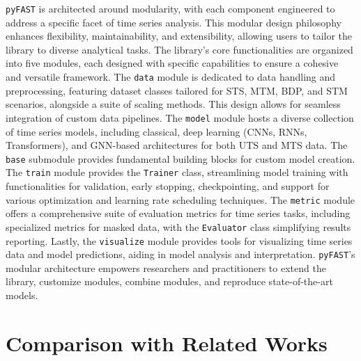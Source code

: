 \documentclass{article}
\begin{document}
\texttt{pyFAST} is architected around modularity, with each component engineered to address a specific facet of time series analysis. This modular design philosophy enhances flexibility, maintainability, and extensibility, allowing users to tailor the library to diverse analytical tasks. The library’s core functionalities are organized into five modules, each designed with specific capabilities to ensure a cohesive and versatile framework. The \texttt{data} module is dedicated to data handling and preprocessing, featuring dataset classes tailored for STS, MTM, BDP, and STM scenarios, alongside a suite of scaling methods. This design allows for seamless integration of custom data pipelines.  The \texttt{model} module hosts a diverse collection of time series models, including classical, deep learning (CNNs, RNNs, Transformers), and GNN-based architectures for both UTS and MTS data. The \texttt{base} submodule provides fundamental building blocks for custom model creation.  The \texttt{train} module provides the \texttt{Trainer} class, streamlining model training with functionalities for validation, early stopping, checkpointing, and support for various optimization and learning rate scheduling techniques. The \texttt{metric} module offers a comprehensive suite of evaluation metrics for time series tasks, including specialized metrics for masked data, with the \texttt{Evaluator} class simplifying results reporting.  Lastly, the \texttt{visualize} module provides tools for visualizing time series data and model predictions, aiding in model analysis and interpretation. \texttt{pyFAST}'s modular architecture empowers researchers and practitioners to extend the library, customize modules, combine modules, and reproduce state-of-the-art models.

\section{Comparison with Related Works}
\end{document}
